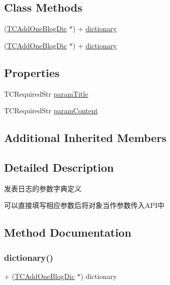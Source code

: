 \subsection*{Class Methods}
\begin{DoxyCompactItemize}
\item 
(\mbox{\hyperlink{interface_t_c_add_one_blog_dic}{T\+C\+Add\+One\+Blog\+Dic}} $\ast$) + \mbox{\hyperlink{interface_t_c_add_one_blog_dic_ab3a6a9fc88da12a6813841f131181814}{dictionary}}
\item 
(\mbox{\hyperlink{interface_t_c_add_one_blog_dic}{T\+C\+Add\+One\+Blog\+Dic}} $\ast$) + \mbox{\hyperlink{interface_t_c_add_one_blog_dic_ab3a6a9fc88da12a6813841f131181814}{dictionary}}
\end{DoxyCompactItemize}
\subsection*{Properties}
\begin{DoxyCompactItemize}
\item 
T\+C\+Required\+Str \mbox{\hyperlink{interface_t_c_add_one_blog_dic_a92ea24dcd519517baf4ee8692470ea83}{param\+Title}}
\item 
T\+C\+Required\+Str \mbox{\hyperlink{interface_t_c_add_one_blog_dic_a71703ed519a93089c49b4faf00e9a34a}{param\+Content}}
\end{DoxyCompactItemize}
\subsection*{Additional Inherited Members}


\subsection{Detailed Description}
发表日志的参数字典定义 

可以直接填写相应参数后将对象当作参数传入\+A\+P\+I中 

\subsection{Method Documentation}
\mbox{\label{interface_t_c_add_one_blog_dic_ab3a6a9fc88da12a6813841f131181814}} 
\subsubsection{\texorpdfstring{dictionary()}{dictionary()}\hspace{0.1cm}{\footnotesize\ttfamily [1/2]}}
{\footnotesize\ttfamily + (\mbox{\hyperlink{interface_t_c_add_one_blog_dic}{T\+C\+Add\+One\+Blog\+Dic}} $\ast$) dictionary \begin{DoxyParamCaption}{ }\end{DoxyParamCaption}}

